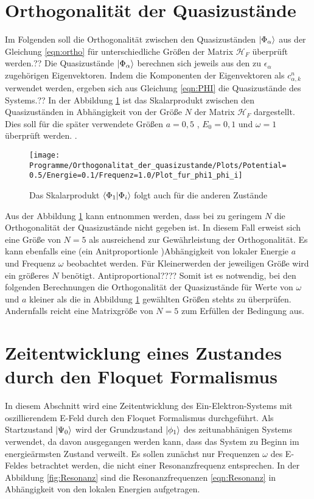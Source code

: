 \section{Orthogonalität der Quasizustände}
Im Folgenden soll die Orthogonalität zwischen den Quasizuständen $\ket{\Phi_\alpha}$ aus der Gleichung \eqref{eqn:ortho} für
unterschiedliche Größen der Matrix $\mathcal{H}_F$ überprüft werden.?? Die Quasizustände $\ket{\Phi_\alpha}$ berechnen sich jeweils aus
den zu $\epsilon_\alpha$ zugehörigen Eigenvektoren. Indem die Komponenten der Eigenvektoren als $c_{\alpha,k}^{n}$ verwendet werden,
ergeben sich aus Gleichung \eqref{eqn:PHI} die Quasizustände des Systems.??
In der Abbildung \ref{fig:ortho} ist das Skalarprodukt zwischen den Quasizuständen in Abhängigkeit von der Größe $N$ der Matrix
$\mathcal{H}_F$ dargestellt.
Dies soll für die später verwendete Größen $a=0,5$ , $E_0=0,1$  und $\omega=1$ überprüft werden.
.

\begin{figure}
    \centering     %
    \texttt{[image: Programme/Orthogonalitat\_der\_quasizustande/Plots/Potential=0.5/Energie=0.1/Frequenz=1.0/Plot\_fur\_phi1\_phi\_i]}
    \caption{Das Skalarprodukt $\braket{\Phi_1|\Phi_i}$ folgt auch für die anderen Zustände}
     \label{fig:ortho}
\end{figure}

Aus der Abbildung \ref{fig:ortho} kann entnommen werden, dass bei zu geringem $N$ die Orthogonalität der Quasizustände
nicht gegeben ist.
In diesem Fall erweist sich eine Größe von $N=5$ als ausreichend zur Gewährleistung der Orthogonalität.
Es kann ebenfalls eine (ein Anitproportionle )Abhängigkeit von lokaler Energie $a$ und Frequenz $\omega$ beobachtet werden.
Für Kleinerwerden der jeweiligen Größe wird ein größeres $N$ benötigt.
Antiproportional????
Somit ist es notwendig,
bei den folgenden Berechnungen die
Orthogonalität der Quasizustände für
Werte von $\omega$ und $a$ kleiner als die in Abbildung
\ref{fig:ortho} gewählten Größen stehts zu überprüfen.
Andernfalls reicht eine Matrixgröße von $N=5$ zum Erfüllen der Bedingung aus.




\section{Zeitentwicklung eines Zustandes durch den Floquet Formalismus}
In diesem Abschnitt wird eine Zeitentwicklung des Ein-Elektron-Systems mit oszillierendem E-Feld durch den Floquet Formalismus durchgeführt.
Als Startzustand $\ket{\Psi_0}$ wird der Grundzustand $\ket{\phi_1}$ des zeitunabhänigen Systems verwendet, da davon
ausgegangen werden kann, dass das System zu Beginn im energieärmsten Zustand verweilt.
Es sollen zunächst nur Frequenzen $\omega$ des E-Feldes
betrachtet werden, die nicht einer Resonanzfrequenz entsprechen.
In der Abbildung \ref{fig:Resonanz} sind
 die Resonanzfrequenzen \eqref{eqn:Resonanz} in Abhängigkeit
von den lokalen Energien aufgetragen.

